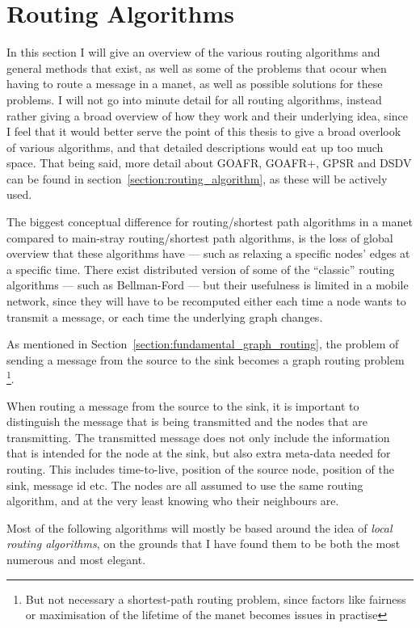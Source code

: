 \section{Routing Algorithms}
\label{section:routing_algorithms}

In this section I will give an overview of the various routing algorithms and general methods that exist, as well as some of the problems that ocour when having to route a message in a \ac{manet}, as well as possible solutions for these problems. I will not go into minute detail for all routing algorithms, instead rather giving a broad overview of how they work and their underlying idea, since I feel that it would better serve the point of this thesis to give a broad overlook of various algorithms, and that detailed descriptions would eat up too much space. That being said, more detail about GOAFR, GOAFR+, GPSR and DSDV can be found in section~\ref{section:routing_algorithm}, as these will be actively used.

The biggest conceptual difference for routing/shortest path algorithms in a \ac{manet} compared to main-stray routing/shortest path algorithms, is the loss of global overview that these algorithms have --- such as relaxing a specific nodes' edges at a specific time. There exist distributed version of some of the ``classic'' routing algorithms --- such as Bellman-Ford --- but their usefulness is limited in a mobile network, since they will have to be recomputed either each time a node wants to transmit a message, or each time the underlying graph changes.

As mentioned in Section~\ref{section:fundamental_graph_routing}, the problem of sending a message from the source to the sink  becomes a graph routing problem \footnote{But not necessary a shortest-path routing problem, since factors like fairness or maximisation of the lifetime of the \ac{manet} becomes issues in practise}.

When routing a message from the source to the sink, it is important to distinguish the message that is being transmitted and the nodes that are transmitting. The transmitted message does not only include the information that is intended for the node at the sink, but also extra meta-data needed for routing. This includes time-to-live, position of the source node, position of the sink, message id etc. The nodes are all assumed to use the same routing algorithm, and at the very least knowing who their neighbours are.

Most of the following algorithms will mostly be based around the idea of \emph{local routing algorithms}, on the grounds that I have found them to be both the most numerous and most elegant.

